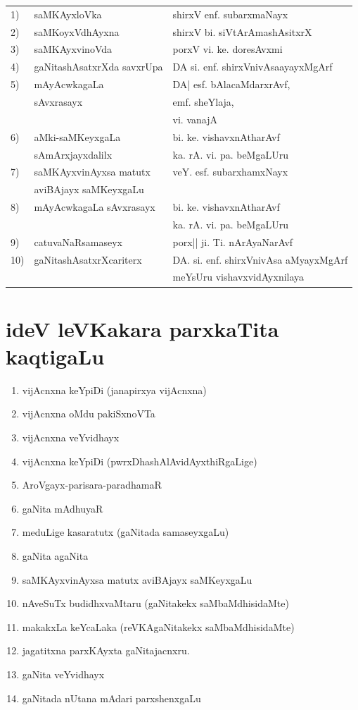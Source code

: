 \medskip
\begin{tabular}{>{\rm }ll@{\hspace{0.9cm}}l}
1) & saMKAyxloVka      & shirxV enf. subarxmaNayx\\[0.2cm]
2) & saMKoyxVdhAyxna    & shirxV bi. siVtArAmashAsitxrX\\[0.2cm]
3) & saMKAyxvinoVda    & porxV vi. ke. doresAvxmi \\[0.2cm]
4) & gaNitashAsatxrXda savxrUpa &  DA si. enf. shirxVnivAsaayayxMgArf\\[0.2cm]
5) & mAyAcwkagaLa  & DA| esf. bAlacaMdarxrAvf,\\   
   &  sAvxrasayx   & \qquad emf. sheYlaja,\\
   &               & \qquad vi. vanajA\\[0.2cm]
6) & aMki-saMKeyxgaLa  & bi. ke. vishavxnAtharAvf \\ 
   & sAmArxjayxdalilx  & ka. rA. vi. pa. beMgaLUru\\[0.2cm]
7) & saMKAyxvinAyxsa matutx & veY. esf. subarxhamxNayx\\
   & aviBAjayx saMKeyxgaLu   &                          \\[0.2cm]
8) & mAyAcwkagaLa sAvxrasayx & bi. ke. vishavxnAtharAvf\\
   &                         & ka. rA. vi. pa. beMgaLUru\\[0.2cm]
9) & catuvaNaRsamaseyx       & porx|| ji. Ti. nArAyaNarAvf\\[0.2cm]
10)&gaNitashAsatxrXcariterx  & DA. si. enf. shirxVnivAsa aMyayxMgArf\\
   &                         & meYsUru vishavxvidAyxnilaya      
\end{tabular}


\vfill
\section*{ideV leVKakara parxkaTita kaqtigaLu}

\begin{enumerate}[{\rm 1)}]
\item vijAcnxna keYpiDi (janapirxya vijAcnxna)
\item vijAcnxna oMdu pakiSxnoVTa
\item vijAcnxna veYvidhayx
\item vijAcnxna keYpiDi (pwrxDhashAlAvidAyxthiRgaLige)
\item AroVgayx-parisara-paradhamaR
\item gaNita mAdhuyaR
\item meduLige kasaratutx (gaNitada samaseyxgaLu)
\item gaNita agaNita
\item saMKAyxvinAyxsa matutx aviBAjayx saMKeyxgaLu
\item nAveSuTx budidhxvaMtaru (gaNitakekx saMbaMdhisidaMte)
\item makakxLa keYcaLaka (reVKAgaNitakekx saMbaMdhisidaMte)
\item jagatitxna parxKAyxta gaNitajacnxru.
\item gaNita veYvidhayx 
\item gaNitada nUtana mAdari parxshenxgaLu
\end{enumerate}
